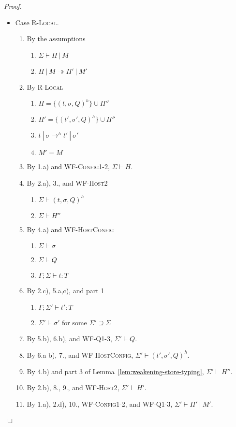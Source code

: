 \begin{proof}
\begin{itemize}
\item Case \textsc{R-Local}.
\begin{enumerate}
\item By the assumptions
  \begin{enumerate}[label=(\alph*)]
  \item $\Sigma \vdash H~|~M$
  \item $H~|~M \twoheadrightarrow H'~|~M'$
  \end{enumerate}
\item By \textsc{R-Local}
  \begin{enumerate}[label=(\alph*)]
  \item $H = \{ (t, \sigma, Q)^h \} \cup H''$
  \item $H' = \{ (t', \sigma', Q)^h \} \cup H''$
  \item $t~|~\sigma \rightarrow^h t'~|~\sigma'$
  \item $M' = M$
  \end{enumerate}
\item By 1.a) and \textsc{WF-Config1-2}, $\Sigma \vdash H$.
\item By 2.a), 3., and \textsc{WF-Host2}
  \begin{enumerate}[label=(\alph*)]
  \item $\Sigma \vdash (t, \sigma, Q)^h$
  \item $\Sigma \vdash H''$
  \end{enumerate}
\item By 4.a) and \textsc{WF-HostConfig}
  \begin{enumerate}[label=(\alph*)]
  \item $\Sigma \vdash \sigma$
  \item $\Sigma \vdash Q$
  \item $\Gamma ; \Sigma \vdash t : T$
  \end{enumerate}
\item By 2.c), 5.a,c), and part 1
  \begin{enumerate}[label=(\alph*)]
  \item $\Gamma ; \Sigma' \vdash t' : T$
  \item $\Sigma' \vdash \sigma'$ for some $\Sigma' \supseteq \Sigma$
  \end{enumerate}
\item By 5.b), 6.b), and \textsc{WF-Q1-3}, $\Sigma' \vdash Q$.
\item By 6.a-b), 7., and \textsc{WF-HostConfig}, $\Sigma' \vdash (t', \sigma', Q)^h$.
\item By 4.b) and part 3 of Lemma~\ref{lem:weakening-store-typing}, $\Sigma' \vdash H''$.
\item By 2.b), 8., 9., and \textsc{WF-Host2}, $\Sigma' \vdash H'$.
\item By 1.a), 2.d), 10., \textsc{WF-Config1-2}, and \textsc{WF-Q1-3}, $\Sigma' \vdash H'~|~M'$.
\end{enumerate}


\end{itemize}
\end{proof}
